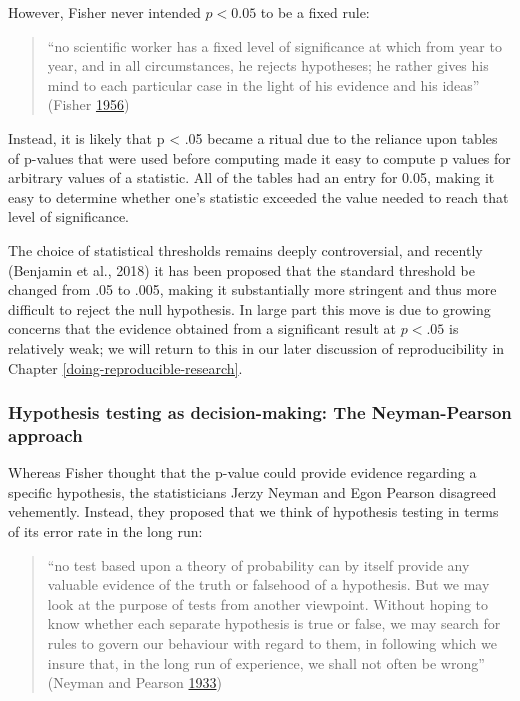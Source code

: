 \documentclass[12pt,]{book}
\theoremstyle{definition}
\theoremstyle{definition}
\theoremstyle{definition}
\theoremstyle{remark}
\begin{document}
However, Fisher never intended \(p < 0.05\) to be a fixed rule:

\begin{quote}
``no scientific worker has a fixed level of significance at which from year to year, and in all circumstances, he rejects hypotheses; he rather gives his mind to each particular case in the light of his evidence and his ideas'' (Fisher \protect\hyperlink{ref-fish:1956}{1956})
\end{quote}

Instead, it is likely that p \textless{} .05 became a ritual due to the reliance upon tables of p-values that were used before computing made it easy to compute p values for arbitrary values of a statistic. All of the tables had an entry for 0.05, making it easy to determine whether one's statistic exceeded the value needed to reach that level of significance.

The choice of statistical thresholds remains deeply controversial, and recently (Benjamin et al., 2018) it has been proposed that the standard threshold be changed from .05 to .005, making it substantially more stringent and thus more difficult to reject the null hypothesis. In large part this move is due to growing concerns that the evidence obtained from a significant result at \(p < .05\) is relatively weak; we will return to this in our later discussion of reproducibility in Chapter \ref{doing-reproducible-research}.

\hypertarget{hypothesis-testing-as-decision-making-the-neyman-pearson-approach}{%
\subsubsection{Hypothesis testing as decision-making: The Neyman-Pearson approach}\label{hypothesis-testing-as-decision-making-the-neyman-pearson-approach}}

Whereas Fisher thought that the p-value could provide evidence regarding a specific hypothesis, the statisticians Jerzy Neyman and Egon Pearson disagreed vehemently. Instead, they proposed that we think of hypothesis testing in terms of its error rate in the long run:

\begin{quote}
``no test based upon a theory of probability can by itself provide any valuable evidence of the truth or falsehood of a hypothesis. But we may look at the purpose of tests from another viewpoint. Without hoping to know whether each separate hypothesis is true or false, we may search for rules to govern our behaviour with regard to them, in following which we insure that, in the long run of experience, we shall not often be wrong'' (Neyman and Pearson \protect\hyperlink{ref-Neyman289}{1933})
\end{quote}
\end{document}
